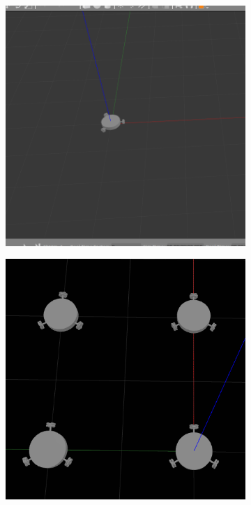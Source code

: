 \documentclass[12pt]{report}
\begin{document}
\begin{figure}[h]
\begin{subfigure}{0.48\textwidth}
    \caption{} \label{fig:single_robot}
  \end{subfigure}%
  \hspace*{\fill}\\
  \begin{subfigure}{0.48\textwidth}
    \includegraphics[width=\linewidth]{single_robot2.png}
    \caption{} \label{fig:single_robot2}
  \end{subfigure}%
  \hspace*{\fill} 
  \begin{subfigure}{0.48\textwidth}
    \includegraphics[width=\linewidth]{multi_robots.png}

\end{subfigure}
\end{figure}
\end{document}
